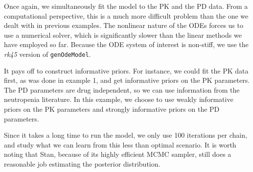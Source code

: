 \documentclass[11pt]{amsart}
\begin{document}
Once again, we simultaneously fit the model to the PK and the PD data. From a computational perspective, this is a much more difficult problem than the one we dealt with in previous examples. The nonlinear nature of the ODEs forces us to use a numerical solver, which is significantly slower than the linear methods we have employed so far. Because the ODE system of interest is non-stiff, we use the \textit{rk45} version of \texttt{genOdeModel}.

It pays off to construct informative priors. For instance, we could fit the PK data first, as was done in  example 1, and get informative priors on the PK parameters. The PD parameters are drug independent, so we can use information from the neutropenia literature. In this example, we choose to use weakly informative priors on the PK parameters and strongly informative priors on the PD parameters. 

Since it takes a long time to run the model, we only use 100 iterations per chain, and study what we can learn from this less than optimal scenario. It is worth noting that Stan, because of its highly efficient MCMC sampler, still does a reasonable job estimating the posterior distribution.
\end{document}
